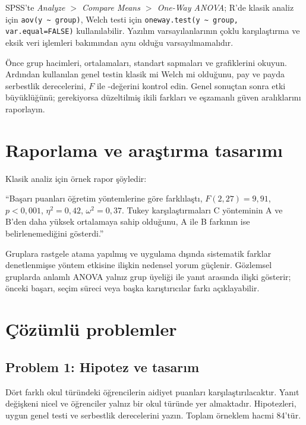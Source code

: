 SPSS'te \emph{Analyze $>$ Compare Means $>$ One-Way ANOVA}; R'de klasik
analiz için \texttt{aov(y \textasciitilde{} group)}, Welch testi için
\texttt{oneway.test(y \textasciitilde{} group, var.equal=FALSE)} kullanılabilir.
Yazılım varsayılanlarının çoklu karşılaştırma ve eksik veri işlemleri
bakımından aynı olduğu varsayılmamalıdır.

\begin{outputguidebox}
Önce grup hacimleri, ortalamaları, standart sapmaları ve grafiklerini okuyun.
Ardından kullanılan genel testin klasik mi Welch mi olduğunu, pay ve payda
serbestlik derecelerini, $F$ ile \pval-değerini kontrol edin. Genel sonuçtan
sonra etki büyüklüğünü; gerekiyorsa düzeltilmiş ikili farkları ve eşzamanlı
güven aralıklarını raporlayın.
\end{outputguidebox}

\section{Raporlama ve araştırma tasarımı}

Klasik analiz için örnek rapor şöyledir:

``Başarı puanları öğretim yöntemlerine göre farklılaştı,
$F(2,27)=9{,}91$, $p<0{,}001$, $\eta^2=0{,}42$,
$\omega^2=0{,}37$. Tukey karşılaştırmaları C yönteminin A ve B'den daha
yüksek ortalamaya sahip olduğunu, A ile B farkının ise belirlenemediğini
gösterdi.''

Gruplara rastgele atama yapılmış ve uygulama dışında sistematik farklar
denetlenmişse yöntem etkisine ilişkin nedensel yorum güçlenir. Gözlemsel
gruplarda anlamlı ANOVA yalnız grup üyeliği ile yanıt arasında ilişki gösterir;
önceki başarı, seçim süreci veya başka karıştırıcılar farkı açıklayabilir.

\section{Çözümlü problemler}

\subsection*{Problem 1: Hipotez ve tasarım}

Dört farklı okul türündeki öğrencilerin aidiyet puanları karşılaştırılacaktır.
Yanıt değişkeni nicel ve öğrenciler yalnız bir okul türünde yer almaktadır.
Hipotezleri, uygun genel testi ve serbestlik derecelerini yazın. Toplam
örneklem hacmi 84'tür.

